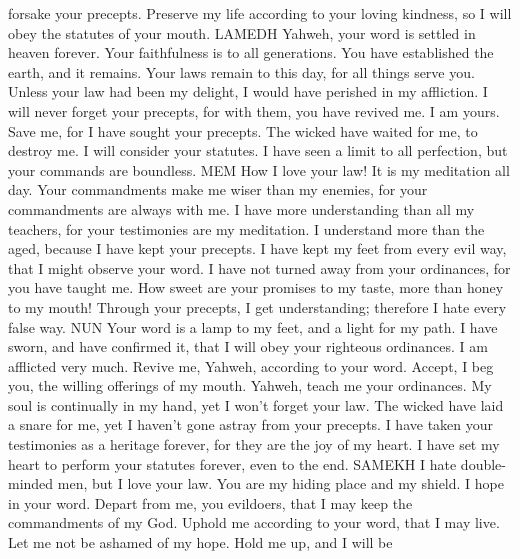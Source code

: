 forsake your precepts.  Preserve my life according to
your loving kindness, so I will obey the statutes of your mouth. LAMEDH
 Yahweh, your word is settled in heaven forever.
 Your faithfulness is to all generations. You have
established the earth, and it remains.  Your laws remain
to this day, for all things serve you.  Unless your law
had been my delight, I would have perished in my affliction.
 I will never forget your precepts, for with them, you
have revived me.  I am yours. Save me, for I have sought
your precepts.  The wicked have waited for me, to destroy
me. I will consider your statutes.  I have seen a limit
to all perfection, but your commands are boundless. MEM 
How I love your law! It is my meditation all day.  Your
commandments make me wiser than my enemies, for your commandments are
always with me.  I have more understanding than all my
teachers, for your testimonies are my meditation.  I
understand more than the aged, because I have kept your precepts.
 I have kept my feet from every evil way, that I might
observe your word.  I have not turned away from your
ordinances, for you have taught me.  How sweet are your
promises to my taste, more than honey to my mouth! 
Through your precepts, I get understanding; therefore I hate every false
way. NUN  Your word is a lamp to my feet, and a light
for my path.  I have sworn, and have confirmed it, that
I will obey your righteous ordinances.  I am afflicted
very much. Revive me, Yahweh, according to your word. 
Accept, I beg you, the willing offerings of my mouth. Yahweh, teach me
your ordinances.  My soul is continually in my hand, yet
I won't forget your law.  The wicked have laid a snare
for me, yet I haven't gone astray from your precepts.  I
have taken your testimonies as a heritage forever, for they are the joy
of my heart.  I have set my heart to perform your
statutes forever, even to the end. SAMEKH  I hate
double-minded men, but I love your law.  You are my
hiding place and my shield. I hope in your word.  Depart
from me, you evildoers, that I may keep the commandments of my God.
 Uphold me according to your word, that I may live. Let
me not be ashamed of my hope.  Hold me up, and I will be
